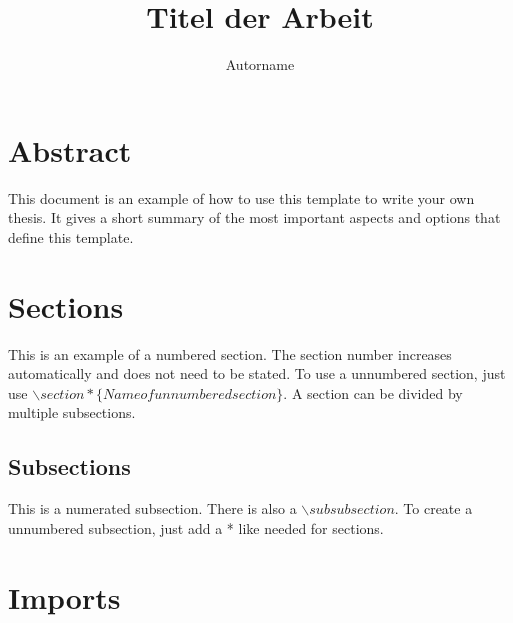 \documentclass[seminararbeit,grey]{mas-thesis}				%
\author{Autorname}
\title{Titel der Arbeit}
\begin{document}
\maketitle				%



\cleardoublepage


\tableofcontents		%

\cleardoublepage

\listofillustrations	%


\cleardoublepage

\setcounter{page}{1}


\section{Abstract}

This document is an example of how to use this template to write your own thesis. It gives a short summary of the most important aspects and options that define this template.

\newpage

\section{Sections}

This is an example of a numbered section. The section number increases automatically and does not need to be stated. To use a unnumbered section, just use $\backslash section* \{Name of unnumbered section\}$. A section can be divided by multiple subsections.

\subsection{Subsections}

This is a numerated subsection. There is also a $\backslash subsubsection$. To create a unnumbered subsection, just add a * like needed for sections.

\section{Imports}
\end{document}
